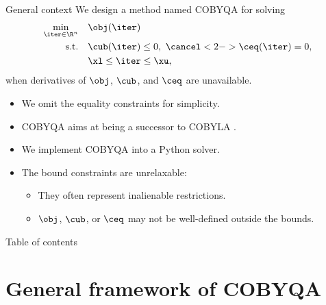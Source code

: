 \documentclass[optimization]{common/talk}
\begin{document}
\begin{frame}{General context}
    We design a method named \alert{COBYQA} for solving
    \begin{equation*}
        \begin{aligned}
            \min_{\iter \in \R^n}   & \quad \obj ( \iter ) \\
            \textrm{s.t.}           & \quad \cub ( \iter ) \le 0, ~ \cancel<2->{\ceq ( \iter ) = 0},\\
                                    & \quad \xl \le \iter \le \xu,
        \end{aligned}
    \end{equation*}
    when derivatives of $\obj$, $\cub$, and $\ceq$ are \alert{unavailable}.

    \pause
    \medskip

    \begin{block}{}
        \begin{itemize}
            \item We omit the equality constraints for simplicity.
            \item COBYQA aims at being a \alert{successor} to COBYLA \parencite{Powell_1994}.
            \item We \alert{implement} COBYQA into a Python solver.
            \item The bound constraints are \alert{unrelaxable}:
            \begin{itemize}
                \item They often represent \alert{inalienable} restrictions.
                \item $\obj$, $\cub$, or $\ceq$ may not be well-defined outside the bounds.
            \end{itemize}
        \end{itemize}
    \end{block}
\end{frame}

\begin{frame}{Table of contents}
    \tableofcontents[hideallsubsections]
\end{frame}

\section{General framework of COBYQA}
\end{document}
